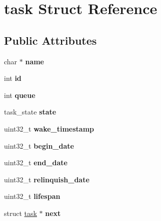 \hypertarget{structtask}{}\section{task Struct Reference}
\label{structtask}
\subsection*{Public Attributes}
\begin{DoxyCompactItemize}
\item 
\mbox{\label{structtask_a9aef5dbd16cfbbdb0c8b13416549a07f}} 
char $\ast$ {\bfseries name}
\item 
\mbox{\label{structtask_a22d3a20ff225043177b269ec1a0a5f1a}} 
int {\bfseries id}
\item 
\mbox{\label{structtask_a495326f350fe8bc5a03739af57481a2e}} 
int {\bfseries queue}
\item 
\mbox{\label{structtask_a665dc156ee4493d4541bc117bd657d67}} 
task\+\_\+state {\bfseries state}
\item 
\mbox{\label{structtask_a73ffa8e22580f103cd5e63796a4d494a}} 
uint32\+\_\+t {\bfseries wake\+\_\+timestamp}
\item 
\mbox{\label{structtask_a44185edf4086dec51b3d23e6edb2e884}} 
uint32\+\_\+t {\bfseries begin\+\_\+date}
\item 
\mbox{\label{structtask_a45a89be105fab99fd428a8201d888668}} 
uint32\+\_\+t {\bfseries end\+\_\+date}
\item 
\mbox{\label{structtask_acc7db59bd7fd5a94666d485d0cd8f0c9}} 
uint32\+\_\+t {\bfseries relinquish\+\_\+date}
\item 
\mbox{\label{structtask_ac48bb50cf51cfe699fe871295497f85d}} 
uint32\+\_\+t {\bfseries lifespan}
\item 
\mbox{\label{structtask_a3f2c7149983c28824baf1aebdfa7af98}} 
struct \hyperlink{structtask}{task} $\ast$ {\bfseries next}
\item 
\mbox{\label{structtask_a1e5835e5305cec65a69e65db7d5f2ac1}} 

\end{DoxyCompactItemize}
